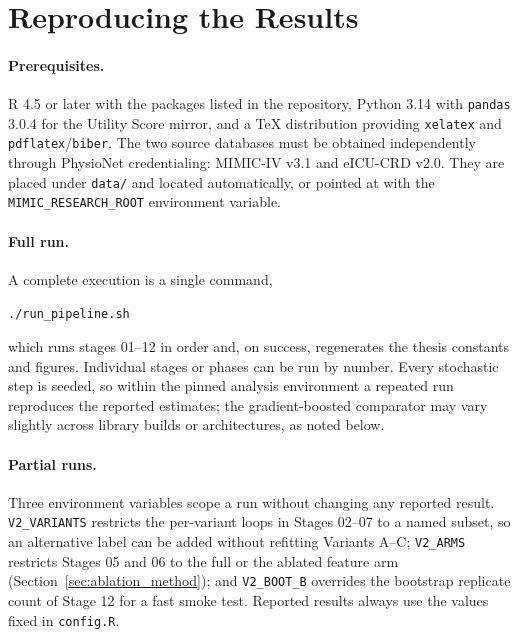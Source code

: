 \section{Reproducing the Results}
\label{app:repro}

\paragraph{Prerequisites.} R 4.5 or later with the packages listed in the
repository, Python 3.14 with \texttt{pandas} 3.0.4 for the Utility Score
mirror, and a \TeX{} distribution providing \texttt{xelatex} and
\texttt{pdflatex}/\texttt{biber}. The two source databases must be obtained
independently through PhysioNet credentialing: MIMIC-IV v3.1 and eICU-CRD
v2.0. They are placed under \texttt{data/} and located automatically, or
pointed at with the \texttt{MIMIC\_RESEARCH\_ROOT} environment variable.

\paragraph{Full run.} A complete execution is a single command,

\begin{center}\texttt{./run\_pipeline.sh}\end{center}

\noindent
which runs stages 01--12 in order and, on success, regenerates the thesis
constants and figures. Individual stages or phases can be run by number. Every
stochastic step is seeded, so within the pinned analysis environment a repeated
run reproduces the reported estimates; the gradient-boosted comparator may vary
slightly across library builds or architectures, as noted below.

\paragraph{Partial runs.} Three environment variables scope a run without
changing any reported result. \texttt{V2\_VARIANTS} restricts the per-variant
loops in Stages 02--07 to a named subset, so an alternative label can be added
without refitting Variants A--C; \texttt{V2\_ARMS} restricts Stages 05 and 06 to
the full or the ablated feature arm (Section~\ref{sec:ablation_method}); and
\texttt{V2\_BOOT\_B} overrides the bootstrap replicate count of Stage 12 for a
fast smoke test. Reported results always use the values fixed in
\texttt{config.R}.


